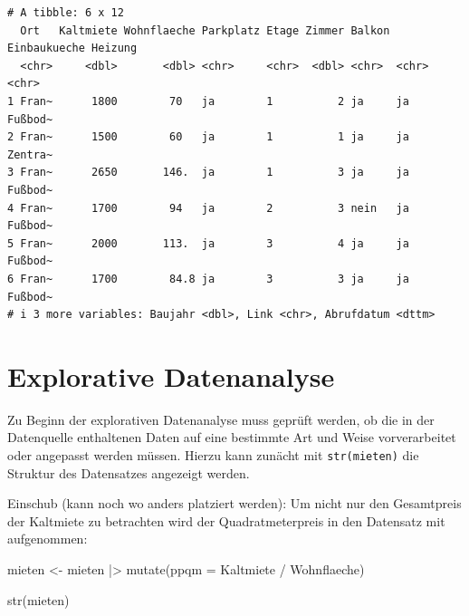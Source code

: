\documentclass[
  a4paper,
  DIV=11]{scrartcl}
\newenvironment{Shaded}{\begin{snugshade}}{\end{snugshade}}
\newcommand{\AttributeTok}[1]{\textcolor[rgb]{0.40,0.45,0.13}{#1}}
\newcommand{\FunctionTok}[1]{\textcolor[rgb]{0.28,0.35,0.67}{#1}}
\newcommand{\NormalTok}[1]{\textcolor[rgb]{0.00,0.23,0.31}{#1}}
\newcommand{\OtherTok}[1]{\textcolor[rgb]{0.00,0.23,0.31}{#1}}
\newcommand{\SpecialCharTok}[1]{\textcolor[rgb]{0.37,0.37,0.37}{#1}}
\begin{document}
\begin{verbatim}
# A tibble: 6 x 12
  Ort   Kaltmiete Wohnflaeche Parkplatz Etage Zimmer Balkon Einbaukueche Heizung
  <chr>     <dbl>       <dbl> <chr>     <chr>  <dbl> <chr>  <chr>        <chr>  
1 Fran~      1800        70   ja        1          2 ja     ja           Fußbod~
2 Fran~      1500        60   ja        1          1 ja     ja           Zentra~
3 Fran~      2650       146.  ja        1          3 ja     ja           Fußbod~
4 Fran~      1700        94   ja        2          3 nein   ja           Fußbod~
5 Fran~      2000       113.  ja        3          4 ja     ja           Fußbod~
6 Fran~      1700        84.8 ja        3          3 ja     ja           Fußbod~
# i 3 more variables: Baujahr <dbl>, Link <chr>, Abrufdatum <dttm>
\end{verbatim}

\hypertarget{explorative-datenanalyse}{%
\section{Explorative Datenanalyse}\label{explorative-datenanalyse}}

Zu Beginn der explorativen Datenanalyse muss geprüft werden, ob die in
der Datenquelle enthaltenen Daten auf eine bestimmte Art und Weise
vorverarbeitet oder angepasst werden müssen. Hierzu kann zunächt mit
\texttt{str(mieten)} die Struktur des Datensatzes angezeigt werden.

Einschub (kann noch wo anders platziert werden): Um nicht nur den
Gesamtpreis der Kaltmiete zu betrachten wird der Quadratmeterpreis in
den Datensatz mit aufgenommen:

\begin{Shaded}
\begin{Highlighting}[]
\NormalTok{mieten }\OtherTok{\textless{}{-}}\NormalTok{ mieten }\SpecialCharTok{|\textgreater{}}
  \FunctionTok{mutate}\NormalTok{(}\AttributeTok{ppqm =}\NormalTok{ Kaltmiete }\SpecialCharTok{/}\NormalTok{ Wohnflaeche)}
\end{Highlighting}
\end{Shaded}

\begin{Shaded}
\begin{Highlighting}[]
\FunctionTok{str}\NormalTok{(mieten)}
\end{Highlighting}
\end{Shaded}
\end{document}
